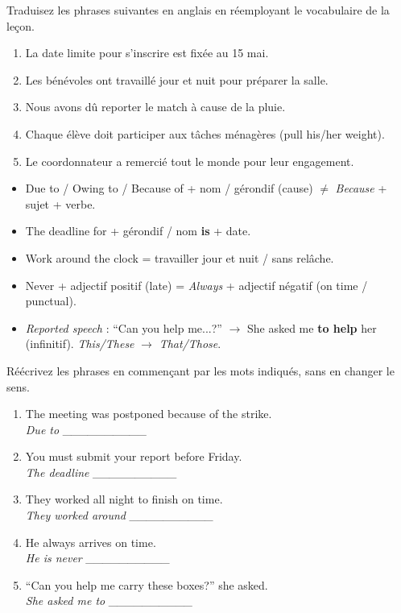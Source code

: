 \documentclass[11pt]{article}
\newcommand{\cle}[1]{{\popxbold\color{popdark}#1}}
\begin{document}
\begin{exercice}
Traduisez les phrases suivantes en anglais en réemployant le vocabulaire de la leçon.
\begin{enumerate}
\item La date limite pour s'inscrire est fixée au 15 mai.
\item Les bénévoles ont travaillé jour et nuit pour préparer la salle.
\item Nous avons dû reporter le match à cause de la pluie.
\item Chaque élève doit participer aux tâches ménagères (pull his/her weight).
\item Le coordonnateur a remercié tout le monde pour leur engagement.
\end{enumerate}
\end{exercice}

\begin{aretenir}
\begin{itemize}
\item \cle{Due to} / \cle{Owing to} / \cle{Because of} + nom / gérondif (cause) $\neq$ \textit{Because} + sujet + verbe.
\item \cle{The deadline for} + gérondif / nom \textbf{is} + date.
\item \cle{Work around the clock} = travailler jour et nuit / sans relâche.
\item \cle{Never} + adjectif positif (late) = \textit{Always} + adjectif négatif (on time / punctual).
\item \textit{Reported speech} : “Can you help me...?” $\rightarrow$ She asked me \textbf{to help} her (infinitif). \textit{This/These} $\rightarrow$ \textit{That/Those}.
\end{itemize}
\end{aretenir}

\begin{exercice}
Réécrivez les phrases en commençant par les mots indiqués, sans en changer le sens.
\begin{enumerate}
\item The meeting was postponed because of the strike. \\
\textit{Due to \_\_\_\_\_\_\_\_\_\_}
\item You must submit your report before Friday. \\
\textit{The deadline \_\_\_\_\_\_\_\_\_\_}
\item They worked all night to finish on time. \\
\textit{They worked around \_\_\_\_\_\_\_\_\_\_}
\item He always arrives on time. \\
\textit{He is never \_\_\_\_\_\_\_\_\_\_}
\item “Can you help me carry these boxes?” she asked. \\
\textit{She asked me to \_\_\_\_\_\_\_\_\_\_}
\end{enumerate}
\end{exercice}
\end{document}
